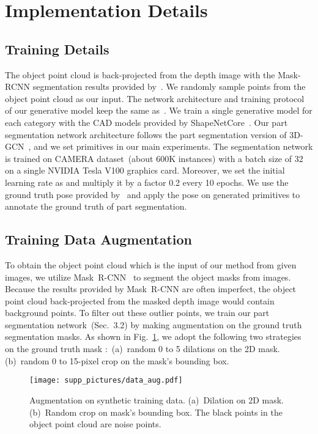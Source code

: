 \documentclass{article}
\begin{document}
  \newpage
\renewcommand\thesection{\Alph{section}}
\setcounter{section}{0}
\section{Implementation Details}
\label{supp:sec:details}
\subsection{Training Details}
The object point cloud is back-projected from the depth image with the Mask-RCNN segmentation results provided by~\cite{SPD}. We randomly sample  points from the object point cloud as our input. 
The network architecture and training protocol of our generative model  keep the same as~\cite{DualSDF}. We train a single generative model for each category with the CAD models provided by ShapeNetCore~\cite{chang2015shapenet}. 
Our part segmentation network architecture follows the part segmentation version of 3D-GCN~\cite{3D-GCN}, and we set  primitives in our main experiments. The segmentation network is trained on CAMERA dataset~(about 600K instances) with a batch size of 32 on a single NVIDIA Tesla V100 graphics card. Moreover, we set the initial learning rate as  and multiply it by a factor 0.2 every 10 epochs. 
We use the ground truth pose provided by~\cite{6-pack} and apply the pose on generated primitives to annotate the ground truth of part segmentation.
\subsection{Training Data Augmentation}
To obtain the object point cloud which is the input of our method from given images, we utilize Mask~R-CNN~\cite{he2017mask} to segment the object masks from images. 
Because the results provided by Mask~R-CNN are often imperfect, the object point cloud back-projected from the masked depth image would contain background points.
To filter out these outlier points, we train our part segmentation network~(Sec.~3.2) by making augmentation on the ground truth segmentation masks. 
As shown in Fig.~\ref{fig:data_aug}, we adopt the following two strategies~\cite{lin2022sar} on the ground truth mask :~(a)~random 0 to 5 dilations on the 2D mask. (b)~random 0 to 15-pixel crop on the mask's bounding box. 

\begin{figure}[!hp]
    \centering
    \texttt{[image: supp\_pictures/data\_aug.pdf]}
    \caption{Augmentation on synthetic training data. (a)~Dilation on 2D mask. (b)~Random crop on mask's bounding box. The black points in the object point cloud are noise points.}
    \label{fig:data_aug}
\end{figure}
\end{document}
